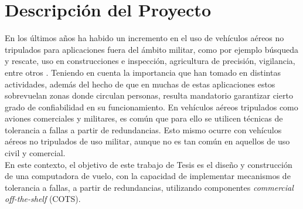 \section{Descripción del Proyecto}





En los últimos años ha habido un incremento en el uso de vehículos aéreos no tripulados para aplicaciones fuera del ámbito militar, como por ejemplo búsqueda y rescate, uso en construcciones e inspección, agricultura de precisión, vigilancia, entre otros \cite{8682048}. Teniendo en cuenta la importancia que han tomado en distintas actividades, además del hecho de que en muchas de estas aplicaciones estos sobrevuelan zonas donde circulan personas, resulta mandatorio garantizar cierto grado de confiabilidad en su funcionamiento. En vehículos aéreos tripulados como aviones comerciales y militares, es común que para ello se utilicen técnicas de tolerancia a fallas a partir de redundancias. Esto mismo ocurre con vehículos aéreos no tripulados de uso militar, aunque no es tan común en aquellos de uso civil y comercial.\\

En este contexto, el objetivo de este trabajo de Tesis es el diseño y construcción de una computadora de vuelo, con la capacidad de implementar mecanismos de tolerancia a fallas, a partir de redundancias, utilizando componentes \textit{commercial off-the-shelf} (COTS).